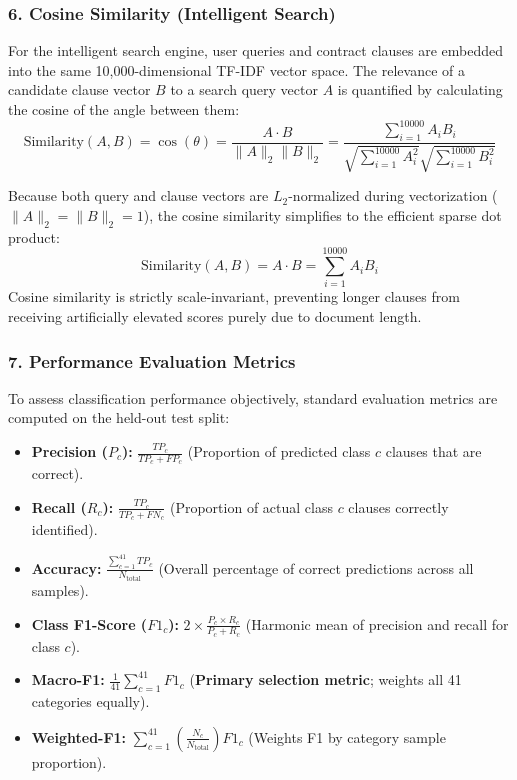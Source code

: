 \subsubsection*{6. Cosine Similarity (Intelligent Search)}
For the intelligent search engine, user queries and contract clauses are embedded into the same 10,000-dimensional TF-IDF vector space. The relevance of a candidate clause vector $B$ to a search query vector $A$ is quantified by calculating the cosine of the angle between them:
\begin{equation}
    \text{Similarity}(A, B) = \cos(\theta) = \frac{A \cdot B}{\|A\|_2 \|B\|_2} = \frac{\sum_{i=1}^{10000} A_i B_i}{\sqrt{\sum_{i=1}^{10000} A_i^2} \sqrt{\sum_{i=1}^{10000} B_i^2}}
\end{equation}

Because both query and clause vectors are $L_2$-normalized during vectorization ($\|A\|_2 = \|B\|_2 = 1$), the cosine similarity simplifies to the efficient sparse dot product:
\begin{equation}
    \text{Similarity}(A, B) = A \cdot B = \sum_{i=1}^{10000} A_i B_i
\end{equation}
Cosine similarity is strictly scale-invariant, preventing longer clauses from receiving artificially elevated scores purely due to document length.

\subsubsection*{7. Performance Evaluation Metrics}
To assess classification performance objectively, standard evaluation metrics are computed on the held-out test split:
\begin{itemize}
    \item \textbf{Precision ($P_c$):} $\frac{TP_c}{TP_c + FP_c}$ (Proportion of predicted class $c$ clauses that are correct).
    \item \textbf{Recall ($R_c$):} $\frac{TP_c}{TP_c + FN_c}$ (Proportion of actual class $c$ clauses correctly identified).
    \item \textbf{Accuracy:} $\frac{\sum_{c=1}^{41} TP_c}{N_{\text{total}}}$ (Overall percentage of correct predictions across all samples).
    \item \textbf{Class F1-Score ($F1_c$):} $2 \times \frac{P_c \times R_c}{P_c + R_c}$ (Harmonic mean of precision and recall for class $c$).
    \item \textbf{Macro-F1:} $\frac{1}{41} \sum_{c=1}^{41} F1_c$ (\textbf{Primary selection metric}; weights all 41 categories equally).
    \item \textbf{Weighted-F1:} $\sum_{c=1}^{41} \left( \frac{N_c}{N_{\text{total}}} \right) F1_c$ (Weights F1 by category sample proportion).
\end{itemize}

